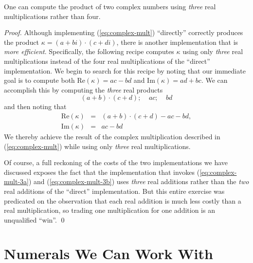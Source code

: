
\begin{prop}
\label{thm:complex-mult-3real}
One can compute the product of two complex numbers using {\em three}
real multiplications rather than four.
\end{prop}

\begin{proof}
Although implementing (\ref{eq:complex-mult}) ``directly'' correctly
produces the product $\kappa = (a+bi) \cdot (c+di)$, there is another
implementation that is {\em more efficient}.  Specifically, the
following recipe computes $\kappa$ using only {\em three} real
multiplications instead of the four real multiplications of the
``direct'' implementation.  We begin to search for this recipe by
noting that our immediate goal is to compute both Re$(\kappa) = ac-bd$
and Im$(\kappa) = ad+bc$.  We can accomplish this by computing the
{\em three} real products
\begin{equation}
\label{eq:complex-mult-3a}
(a+b) \cdot (c+d); \ \ \ \ \
ac;  \ \ \ \ \ bd
\end{equation}
and then noting that
\begin{equation}
\label{eq:complex-mult-3b}
\begin{array}{lcl}
\mbox{Re}(\kappa) & = & (a+b) \cdot (c+d) - ac -bd, \\
\mbox{Im}(\kappa) & = & ac -bd
\end{array}
\end{equation}
We thereby achieve the result of the complex multiplication described
in (\ref{eq:complex-mult}) while using only {\em three} real
multiplications.

Of course, a full reckoning of the costs of the two implementations we
have discussed exposes the fact that the implementation that invokes
(\ref{eq:complex-mult-3a}) and (\ref{eq:complex-mult-3b}) uses {\em
  three} real additions rather than the {\em two} real additions of
the ``direct'' implementation.  But this entire exercise was
predicated on the observation that each real addition is much less
costly than a real multiplication, so trading one multiplication for
one addition is an unqualified ``win''.  \qed
\end{proof}


\section{Numerals We Can Work With}
\label{sec:Numerals}


